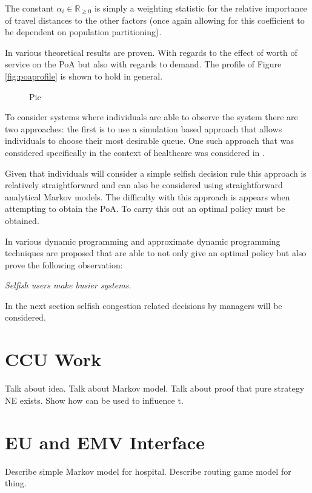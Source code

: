 \documentclass[a4paper,11pt]{article}
\begin{document}
The constant $\alpha_i\in\mathbb{R}_{\geq0}$ is simply a weighting statistic for the relative importance of travel distances to the other factors (once again allowing for this coefficient to be dependent on population partitioning).

In \cite{} various theoretical results are proven. With regards to the effect of worth of service on the PoA but also with regards to demand. The profile of Figure \ref{fig:poaprofile} is shown to hold in general.

\begin{figure}[!hbtp]
Pic
\end{figure}

To consider systems where individuals are able to observe the system there are two approaches: the first is to use a simulation based approach that allows individuals to choose their most desirable queue.
One such approach that was considered specifically in the context of healthcare was considered in \cite{}.

Given that individuals will consider a simple selfish decision rule this approach is relatively straightforward and can also be considered using straightforward analytical Markov models.
The difficulty with this approach is appears when attempting to obtain the PoA.
To carry this out an optimal policy must be obtained.

In \cite{} various dynamic programming and approximate dynamic programming techniques are proposed that are able to not only give an optimal policy but also prove the following observation:

\begin{center}
\textit{Selfish users make busier systems.}
\end{center}

In the next section selfish congestion related decisions by managers will be considered.

\section{CCU Work}

Talk about idea.
Talk about Markov model.
Talk about proof that pure strategy NE exists.
Show how can be used to influence t.

\section{EU and EMV Interface}

Describe simple Markov model for hospital.
Describe routing game model for thing.
\end{document}
